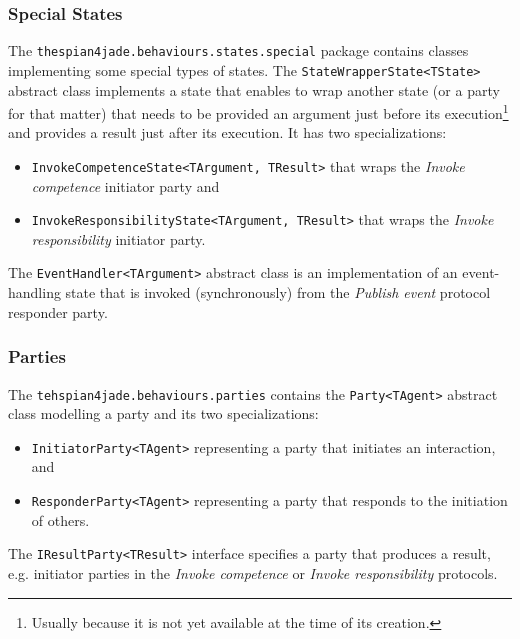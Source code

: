\subsubsection*{Special States}

The \texttt{thespian4jade.behaviours.states.special} package contains classes implementing some special types of states.
The \texttt{StateWrapperState<TState>} abstract class implements a state that enables to wrap another state (or a party for that matter) that needs to be provided an argument just before its execution\footnote{Usually because it is not yet available at the time of its creation.} and provides a result just after its execution.
It has two specializations:
\begin{itemize}
	\item \texttt{InvokeCompetenceState<TArgument, TResult>} that wraps the \textit{Invoke competence} initiator party and
	\item \texttt{InvokeResponsibilityState<TArgument, TResult>} that wraps the \textit{Invoke responsibility} initiator party.
\end{itemize}

The \texttt{EventHandler<TArgument>} abstract class is an implementation of an event-handling state that is invoked (synchronously) from the \textit{Publish event} protocol responder party.

\subsubsection{Parties}

The \texttt{tehspian4jade.behaviours.parties} contains the \texttt{Party<TAgent>} abstract class modelling a party and its two specializations:
\begin{itemize}
	\item \texttt{InitiatorParty<TAgent>} representing a party that initiates an interaction, and
	\item \texttt{ResponderParty<TAgent>} representing a party that responds to the initiation of others.
\end{itemize}
The \texttt{IResultParty<TResult>} interface specifies a party that produces a result, e.g. initiator parties in the \textit{Invoke competence} or \textit{Invoke responsibility} protocols.

